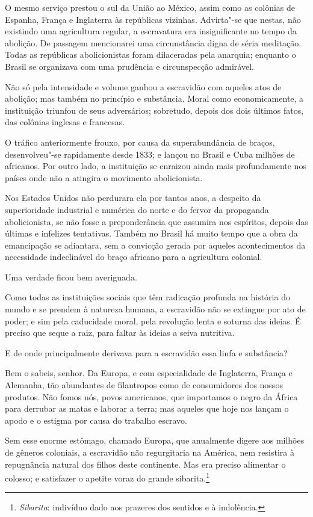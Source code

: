 O mesmo serviço prestou o sul da União ao México, assim como as colônias
de Espanha, França e Inglaterra às repúblicas vizinhas. Advirta"-se
que nestas, não existindo uma agricultura regular, a escravatura era
insignificante no tempo da abolição. De passagem mencionarei uma
circunstância digna de séria meditação. Todas as repúblicas
abolicionistas foram dilaceradas pela anarquia; enquanto o Brasil se
organizava com uma prudência e circunspecção admirável. 

Não só pela intensidade e volume ganhou a escravidão com aqueles atos de
abolição; mas também no princípio e substância. Moral como
economicamente, a instituição triunfou de seus adversários; sobretudo,
depois dos dois últimos fatos, das colônias inglesas e francesas.

O tráfico anteriormente frouxo, por causa da superabundância de braços,
desenvolveu"-se rapidamente desde 1833; e lançou no Brasil e Cuba
milhões de africanos. Por outro lado, a instituição se enraizou ainda
mais profundamente nos países onde não a atingira o movimento abolicionista.

Nos Estados Unidos não perdurara ela por tantos anos, a despeito da
superioridade industrial e numérica do norte e do fervor da propaganda
abolicionista, se não fosse a preponderância que assumira nos
espíritos, depois das últimas e infelizes tentativas. Também no Brasil
há muito tempo que a obra da emancipação se adiantara, sem a convicção
gerada por aqueles acontecimentos da necessidade indeclinável do braço
africano para a agricultura colonial.

Uma verdade ficou bem averiguada.

Como todas as instituições sociais que têm radicação profunda na
história do mundo e se prendem à natureza humana, a escravidão não se
extingue por ato de poder; e sim pela caducidade moral, pela revolução
lenta e soturna das ideias. É preciso que seque a raiz, para faltar às
ideias a seiva nutritiva.

E de onde principalmente derivava para a escravidão essa linfa e substância?

Bem o sabeis, senhor. Da Europa, e com especialidade de Inglaterra,
França e Alemanha, tão abundantes de filantropos como de consumidores
dos nossos produtos. Não fomos nós, povos americanos, que importamos o
negro da África para derrubar as matas e laborar a terra; mas aqueles
que hoje nos lançam o apodo e o estigma por causa do trabalho escravo.

Sem esse enorme estômago, chamado Europa, que anualmente digere aos
milhões de gêneros coloniais, a escravidão não regurgitaria na América,
nem resistira à repugnância natural dos filhos deste continente. Mas
era preciso alimentar o colosso; e satisfazer o apetite voraz do grande
sibarita.\footnote{ \textit{Sibarita}: indivíduo dado aos prazeres dos sentidos e à indolência.}
 


